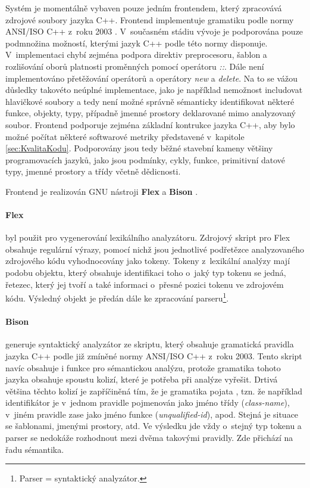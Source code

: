 \documentclass[11pt,twoside,a4paper]{book}
\begin{document}
Systém je momentálně vybaven pouze jedním frontendem, který zpracovává zdrojové soubory jazyka C++. Frontend implementuje
gramatiku podle normy ANSI/ISO C++ z~roku 2003 \cite{ISOCpp03}. V~současném stádiu vývoje je podporována pouze podmnožina možností, kterými
jazyk C++ podle této normy disponuje. V~implementaci chybí zejména podpora direktiv preprocesoru, šablon a rozlišování oborů platnosti
proměnných pomocí operátoru \textit{::}. Dále není implementováno přetěžování operátorů a operátory \textit{new} a \textit{delete}.
Na to se vážou důsledky takovéto neúplné implementace, jako je například nemožnost includovat hlavičkové soubory a tedy není možné
správně sémanticky identifikovat některé funkce, objekty, typy, případně jmenné prostory deklarované mimo analyzovaný soubor.
Frontend podporuje zejména základní kontrukce jazyka C++, aby bylo možné počítat některé softwarové metriky představené v~kapitole \ref{sec:KvalitaKodu}.
Podporovány jsou tedy běžné stavební kameny většiny programovacích jazyků, jako jsou podmínky, cykly, funkce, primitivní datové typy,
jmenné prostory a třídy včetně dědicnosti.

Frontend je realizován GNU nástroji \textbf{Flex} \cite{Flex} a \textbf{Bison} \cite{Bison}.

\paragraph{Flex} byl použit pro vygenerování lexikálního analyzátoru. Zdrojový skript pro Flex obsahuje regulární výrazy, pomocí nichž
jsou jednotlivé podřetězce analyzovaného zdrojového kódu vyhodnocovány jako tokeny. Tokeny z~lexikální analýzy mají podobu objektu, který
obsahuje identifikaci toho o~jaký typ tokenu se jedná, řetezec, který jej tvoří a také informaci o~přesné pozici tokenu ve zdrojovém kódu.
Výsledný objekt je předán dále ke zpracování parseru\footnote{Parser = syntaktický analyzátor.}.

\paragraph{Bison} generuje syntaktický analyzátor ze skriptu, který obsahuje gramatická pravidla jazyka C++ podle již zmíněné normy ANSI/ISO C++ z~roku 2003.
Tento skript navíc obsahuje i funkce pro sémantickou analýzu, protože gramatika tohoto jazyka obsahuje spoustu kolizí, které je potřeba při analýze vyřešit.
Drtivá většina těchto kolizí je zapříčiněná tím, že je gramatika pojata , tzn. že například identifikátor je v~jednom pravidle pojmenován jako
jméno třídy (\textit{class-name}), v~jiném pravidle zase jako jméno funkce (\textit{unqualified-id}), apod. Stejná je situace se šablonami, jmenými prostory, atd.
Ve výsledku jde vždy o~stejný typ tokenu a parser se nedokáže rozhodnout mezi dvěma takovými pravidly. Zde přichází na řadu sémantika.
\end{document}
